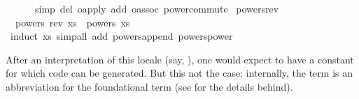 \begin{isabellebody}
\ \ \ \ \ \ simp\ del{\isacharcolon}\ o{\isacharunderscore}apply\ add{\isacharcolon}\ o{\isacharunderscore}assoc\ power{\isacharunderscore}commute{\isacharparenright}\isanewline
\isanewline
{}\isamarkupfalse%
\ powers{\isacharunderscore}rev{\isacharcolon}\isanewline
\ \ {\isachardoublequoteopen}powers\ {\isacharparenleft}rev\ xs{\isacharparenright}\ {\isacharequal}\ powers\ xs{\isachardoublequoteclose}\isanewline
\ \ \ \ \isamarkupfalse%
\ {\isacharparenleft}induct\ xs{\isacharparenright}\ {\isacharparenleft}simp{\isacharunderscore}all\ add{\isacharcolon}\ powers{\isacharunderscore}append\ powers{\isacharunderscore}power{\isacharparenright}\isanewline
\isanewline
{}\isamarkupfalse%
%
\endisatagquote
{\isafoldquote}%
%
\isadelimquote
%
\endisadelimquote
%
\begin{isamarkuptext}%
After an interpretation of this locale (say, \hyperlink{command.interpretation}{\mbox{}}  ), one would expect to have a constant  for which code
  can be generated.  But this not the case: internally, the term
   is an abbreviation for the foundational
  term 
  (see \cite{isabelle-locale} for the details behind).


\end{isamarkuptext}
\end{isabellebody}
